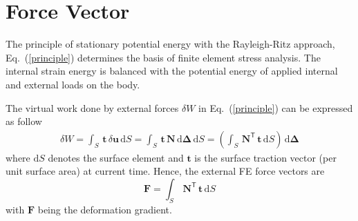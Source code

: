 \section{Force Vector}



The principle of stationary potential energy with the Rayleigh-Ritz approach, Eq.~(\ref{principle}) determines the basis of finite element stress analysis. The internal strain energy is balanced with the potential energy of applied internal and external loads on the body.

The virtual work done by external forces $\delta{W}$ in Eq.~(\ref{principle}) can be expressed as follow
\begin{equation}
	\begin{aligned}
	\delta{W} = \int_{S} \, \mathbf{t} \, \delta \mathbf{u} \, \mathrm{d} S
	 = \int_{S} \, \mathbf{t} \, \mathbf{N} \, \mathrm{d} \boldsymbol{\Delta} \, \mathrm{d} S
	= \left( \int_{S} \, \mathbf{N}^{\mathsf{T}} \, \mathbf{t} \, \mathrm{d} S \right) \, \mathrm{d} \boldsymbol{\Delta}
	\end{aligned}
\end{equation}
where $\mathrm{d} S$ denotes the surface element and $\mathbf{t}$ is the surface traction vector (per unit surface area) at current time. Hence, the external FE force vectors are
\begin{equation}
    \mathbf{F} = \int_{S} \, \mathbf{N}^{\mathsf{T}} \, \mathbf{t} \, \mathrm{d} S 
\end{equation}
with $ \mathbf{F} $ being the deformation gradient.



